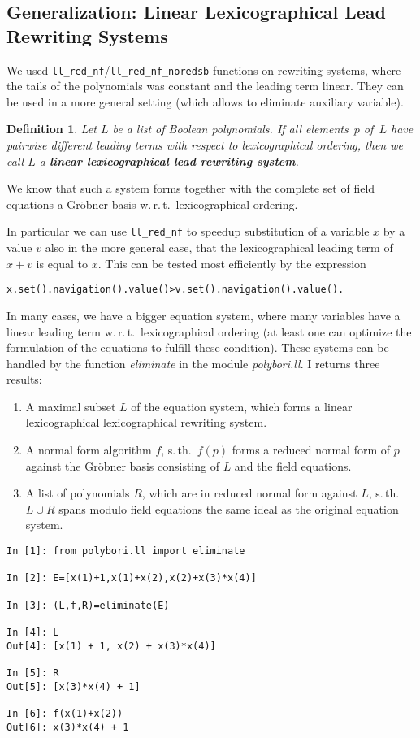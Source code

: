 \documentclass[]{article}
\newcommand{\Groebner}{Gröbner\xspace}
\newcommand{\functionname}[1]{\textit{#1}\xspace}
\newcounter{thm}
\newtheorem{definition}[thm]{Definition}
\begin{document}
\subsection{Generalization: Linear Lexicographical Lead Rewriting Systems}

We used \verb|ll_red_nf|/\verb|ll_red_nf_noredsb| functions on rewriting systems, where the tails of the polynomials was constant and the leading term linear.
They can be used in a more general setting (which allows to eliminate auxiliary variable).
\begin{definition}
Let $L$ be a list of Boolean polynomials.
If all elements~$p$ of~$L$ have pairwise different leading terms with respect to lexicographical ordering,
then we call $L$ a \textbf{linear lexicographical lead rewriting system}.
\end{definition}
We know that such a system forms together with the complete set of field
equations a \Groebner basis w.\,r.\,t.\ lexicographical ordering.

In particular we can use \verb|ll_red_nf| to speedup substitution of a variable $x$ by a value $v$ also in the more general case, that the lexicographical leading term of $x+v$ is equal to $x$.
This can be tested most efficiently by the expression
\begin{verbatim}
x.set().navigation().value()>v.set().navigation().value().
\end{verbatim}

In many cases, we have a bigger equation system, where many variables have a linear leading term w.\,r.\,t.\ lexicographical ordering (at least one can optimize the formulation of the equations to fulfill these condition).
%
These systems can be handled by the function \functionname{eliminate} in the module \functionname{polybori.ll}.
I returns three results:
\begin{enumerate}
    \item A maximal subset $L$ of the equation system, which forms a linear lexicographical lexicographical rewriting system.
    \item A normal form algorithm $f$, s.\,th.\ $f(p)$ forms a reduced normal form of $p$ against the \Groebner basis consisting of $L$ and the field equations.
    \item A list of polynomials $R$, which are in reduced normal form against $L$, s.\,th.\ $L\cup R$ spans modulo field equations the same ideal as the original equation system.
\end{enumerate}

\begin{verbatim}
In [1]: from polybori.ll import eliminate

In [2]: E=[x(1)+1,x(1)+x(2),x(2)+x(3)*x(4)]

In [3]: (L,f,R)=eliminate(E)

In [4]: L
Out[4]: [x(1) + 1, x(2) + x(3)*x(4)]

In [5]: R
Out[5]: [x(3)*x(4) + 1]

In [6]: f(x(1)+x(2))
Out[6]: x(3)*x(4) + 1
\end{verbatim}


%

\end{document}

